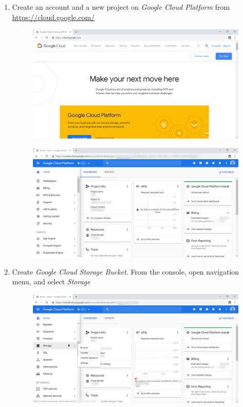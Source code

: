 \begin{enumerate}
	\item Create an account and a new project on \textit{Google Cloud Platform} from \href{https://cloud.google.com/}{https://cloud.google.com/}
	      \begin{center}
	      	\begin{figure}[H]
	      		\centering
	      		\includegraphics[width=0.6\columnwidth]{images/appendixA/GCP-homepage.PNG}
	      	\end{figure}
	      \end{center}
	      \begin{center}
	      	\begin{figure}[H]
	      		\centering
	      		\includegraphics[width=0.6\columnwidth]{images/appendixA/GCP-console.PNG}
	      	\end{figure}
	      \end{center}
	\item Create \textit{Google Cloud Storage Bucket}. From the console, open navigation menu, and select \textit{Storage}
	      \begin{center}
	      	\begin{figure}[H]
	      		\centering
	      		\includegraphics[width=0.6\columnwidth]{images/appendixA/GCP-navigate-Storage.PNG}

\end{figure}
\end{center}
\end{enumerate}
